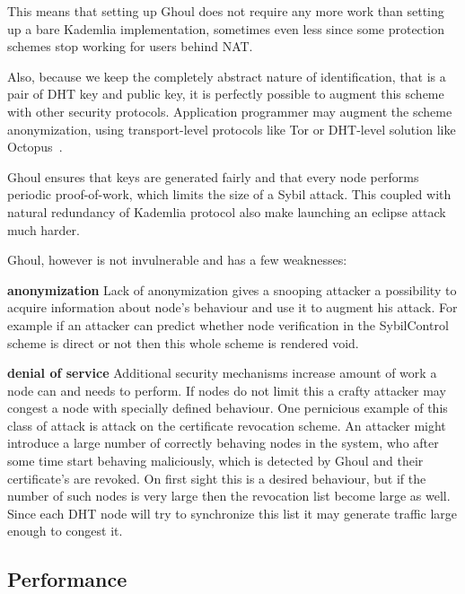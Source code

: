   This means that setting up Ghoul does not require any more work than setting
  up a bare Kademlia implementation, sometimes even less since some protection
  schemes stop working for users behind NAT.

  Also, because we keep the completely abstract nature of identification, that
  is a pair of DHT key and public key, it is perfectly possible to augment this
  scheme with other security protocols. Application programmer may augment the
  scheme anonymization, using transport-level protocols like Tor or DHT-level
  solution like Octopus~\cite{wan12b}.

  Ghoul ensures that keys are generated fairly and that every node performs
  periodic proof-of-work, which limits the size of a Sybil attack. This coupled
  with natural redundancy of Kademlia protocol also make launching an eclipse
  attack much harder.

  Ghoul, however is not invulnerable and has a few weaknesses:

  \begin{description}
    \item{\textbf{anonymization}} Lack of anonymization gives a snooping
      attacker a possibility to acquire information about node's behaviour and
      use it to augment his attack. For example if an attacker can predict
      whether node verification in the SybilControl scheme is direct or not then
      this whole scheme is rendered void.
    \item{\textbf{denial of service}} Additional security mechanisms increase
      amount of work a node can and needs to perform. If nodes do not limit this
      a crafty attacker may congest a node with specially defined behaviour. One
      pernicious example of this class of attack is attack on the certificate
      revocation scheme. An attacker might introduce a large number of correctly
      behaving nodes in the system, who after some time start behaving
      maliciously, which is detected by Ghoul and their certificate's are
      revoked. On first sight this is a desired behaviour, but if the number of
      such nodes is very large then the revocation list become large as well.
      Since each DHT node will try to synchronize this list it may generate
      traffic large enough to congest it.
  \end{description}

  \subsection{Performance}

